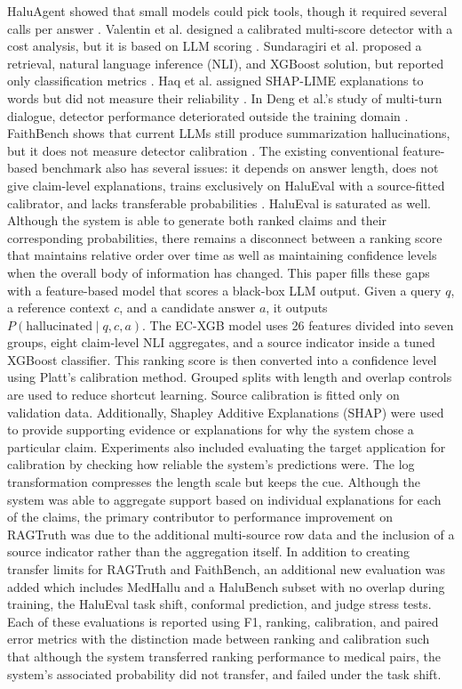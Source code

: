 \documentclass[a4paper,fleqn]{cas-sc}
\begin{document}
HaluAgent showed that small models could pick tools, though it required several calls per answer \cite{haluagent}. Valentin et al. designed a calibrated multi-score detector with a cost analysis, but it is based on LLM scoring \cite{costeff}. Sundaragiri et al. proposed a retrieval, natural language inference (NLI), and XGBoost solution, but reported only classification metrics \cite{ijert}. Haq et al. assigned SHAP-LIME explanations to words but did not measure their reliability \cite{multimedia}. In Deng et al.'s study of multi-turn dialogue, detector performance deteriorated outside the training domain \cite{spikescore}. FaithBench shows that current LLMs still produce summarization hallucinations, but it does not measure detector calibration \cite{faithbench}. The existing conventional feature-based benchmark also has several issues: it depends on answer length, does not give claim-level explanations, trains exclusively on HaluEval with a source-fitted calibrator, and lacks transferable probabilities \cite{ovadia2019}. HaluEval is saturated as well. Although the system is able to generate both ranked claims and their corresponding probabilities, there remains a disconnect between a ranking score that maintains relative order over time as well as maintaining confidence levels when the overall body of information has changed. This paper fills these gaps with a feature-based model that scores a black-box LLM output. Given a query $q$, a reference context $c$, and a candidate answer $a$, it outputs $P(\text{hallucinated}\mid q,c,a)$. The EC-XGB model uses 26 features divided into seven groups, eight claim-level NLI aggregates, and a source indicator inside a tuned XGBoost classifier. This ranking score is then converted into a confidence level using Platt's calibration method. Grouped splits with length and overlap controls are used to reduce shortcut learning. Source calibration is fitted only on validation data. Additionally, Shapley Additive Explanations (SHAP) were used to provide supporting evidence or explanations for why the system chose a particular claim. Experiments also included evaluating the target application for calibration by checking how reliable the system's predictions were. The log transformation compresses the length scale but keeps the cue. Although the system was able to aggregate support based on individual explanations for each of the claims, the primary contributor to performance improvement on RAGTruth was due to the additional multi-source row data and the inclusion of a source indicator rather than the aggregation itself. In addition to creating transfer limits for RAGTruth and FaithBench, an additional new evaluation was added which includes MedHallu \cite{pandit2025medhallu} and a HaluBench subset \cite{ravi2024lynx} with no overlap during training, the HaluEval task shift, conformal prediction, and judge stress tests. Each of these evaluations is reported using F1, ranking, calibration, and paired error metrics with the distinction made between ranking and calibration such that although the system transferred ranking performance to medical pairs, the system's associated probability did not transfer, and failed under the task shift.
\end{document}
